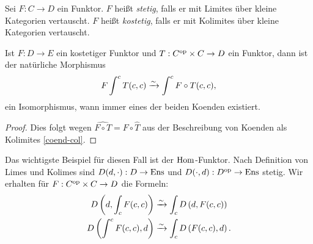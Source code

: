\begin{defn}
  Sei $F: C \to D$ ein Funktor. $F$ heißt \emph{stetig}, falls er mit
  Limites über kleine Kategorien vertauscht. $F$ heißt
  \emph{kostetig}, falls er mit Kolimites über kleine Kategorien
  vertauscht.
\end{defn}
\begin{kor}
  \label{coend-cocont}
  Ist $F: D \to E$ ein kostetiger Funktor und $T: C^\mathrm{op} \times C \to D$
  ein Funktor, dann ist der natürliche Morphismus
  \[ F \int^c T(c, c) \xrightarrow[]{\sim} \int^c F \circ T(c, c), \]
  ein Isomorphismus, wann immer eines der beiden Koenden existiert.
\end{kor}
\begin{proof}
  Dies folgt wegen $\widehat{F \circ T} = F \circ \widehat{T}$ aus der
  Beschreibung von Koenden als Kolimites \ref{coend-col}.
\end{proof}
\begin{bem}
  Das wichtigste Beispiel für diesen Fall ist der $\operatorname{Hom}$-Funktor. Nach
  Definition von Limes und Kolimes sind $D(d, \cdot): D \to \operatorname{Ens}$ und
  $D(\cdot, d): D^\mathrm{op} \to \operatorname{Ens}$ stetig. Wir erhalten für $F: C^\mathrm{op}
  \times C \to D$ die Formeln:
  \begin{align*}
    D \left( d, \int_c F(c, c) \right) & \xrightarrow[]{\sim} \int_c D \left( d, F(c, c) \right) \\
    D \left( \int^c F(c, c), d \right) &\xrightarrow[]{\sim} \int_c D \left( F(c, c), d \right) .
  \end{align*}
\end{bem}

